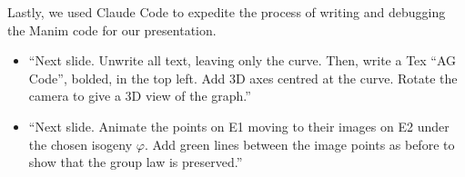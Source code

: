 \documentclass[twocolumn, 11pt]{scrartcl}
\begin{document}
Lastly, we used Claude Code to expedite the process of writing and debugging the Manim code for our presentation.
\begin{itemize}
    \item ``Next slide. Unwrite all text, leaving only the curve. Then, write a Tex ``AG Code'', bolded, in the top left. Add 3D axes centred at the curve. Rotate the camera to give a 3D view of the graph.''
    \item ``Next slide. Animate the points on E1 moving to their images on E2 under the chosen isogeny $\varphi$. Add green lines between the image points as before to show that the group law is preserved.''
\end{itemize}
\end{document}
